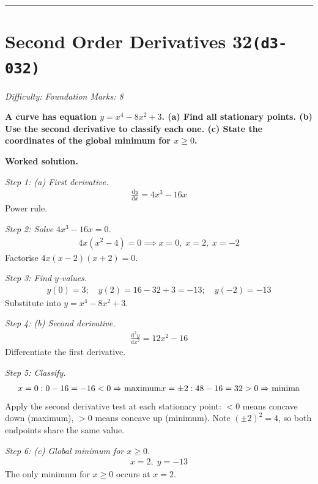 \documentclass[11pt]{article}
\newcommand{\question}[1]{\par\medskip\noindent\textbf{#1}\par}
\begin{document}
\medskip\hrule

\section*{Second Order Derivatives 32\quad\small\texttt{(d3-032)}}
\textit{Difficulty: Foundation \quad\textbar\quad Marks: 8}

\question{A curve has equation \( y = x^4 - 8x^2 + 3 \). (a) Find all stationary points. (b) Use the second derivative to classify each one. (c) State the coordinates of the global minimum for \( x \geq 0 \).}

\textbf{Worked solution.}

\textit{Step 1: (a) First derivative.}
\[\begin{gathered}
\frac{\mathrm{d}y}{\mathrm{d}x} = 4x^3 - 16x
\end{gathered}\]
Power rule.

\textit{Step 2: Solve \( 4x^3 - 16x = 0 \).}
\[\begin{gathered}
4x(x^2 - 4) = 0 \implies x = 0,\; x = 2,\; x = -2
\end{gathered}\]
Factorise \( 4x(x-2)(x+2) = 0 \).

\textit{Step 3: Find \( y \)-values.}
\[\begin{gathered}
y(0) = 3; \quad y(2) = 16 - 32 + 3 = -13; \quad y(-2) = -13
\end{gathered}\]
Substitute into \( y = x^4 - 8x^2 + 3 \).

\textit{Step 4: (b) Second derivative.}
\[\begin{gathered}
\frac{\mathrm{d}^2y}{\mathrm{d}x^2} = 12x^2 - 16
\end{gathered}\]
Differentiate the first derivative.

\textit{Step 5: Classify.}
\[\begin{gathered}
x=0: 0-16 = -16 < 0 \Rightarrow \text{maximum} \newline x=\pm 2: 48-16 = 32 > 0 \Rightarrow \text{minima}
\end{gathered}\]
Apply the second derivative test at each stationary point: \(< 0\) means concave down (maximum), \(> 0\) means concave up (minimum). Note \( (\pm 2)^2 = 4 \), so both endpoints share the same value.

\textit{Step 6: (c) Global minimum for \( x \geq 0 \).}
\[\begin{gathered}
x = 2,\; y = -13
\end{gathered}\]
The only minimum for \( x \geq 0 \) occurs at \( x = 2 \).
\end{document}
